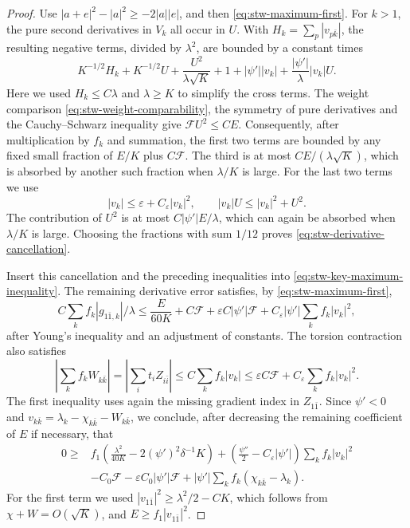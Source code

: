 \begin{proof}
Use $|a+e|^2-|a|^2\geq-2|a||e|$, and then \eqref{eq:stw-maximum-first}. For $k>1$, the pure second derivatives in $V_k$ all occur in $U$. With $H_k=\sum_p|v_{p\bar k}|$, the resulting negative terms, divided by $\lambda^2$, are bounded by a constant times
\[
 K^{-1/2}H_k+K^{-1/2}U
       +\frac{U^2}{\lambda\sqrt K}+1
       +|\psi'||v_k|+\frac{|\psi'|}{\lambda}|v_k|U.
\]
Here we used $H_k\leq C\lambda$ and $\lambda\geq K$ to simplify the cross terms. The weight comparison \eqref{eq:stw-weight-comparability}, the symmetry of pure derivatives and the Cauchy--Schwarz inequality give $\mathcal F U^2\leq C E$. Consequently, after multiplication by $f_k$ and summation, the first two terms are bounded by any fixed small fraction of $E/K$ plus $C\mathcal F$. The third is at most $CE/(\lambda\sqrt K)$, which is absorbed by another such fraction when $\lambda/K$ is large. For the last two terms we use
\[
 |v_k|\leq\varepsilon+C_\varepsilon|v_k|^2,\qquad
 |v_k|U\leq |v_k|^2+U^2.
\]
The contribution of $U^2$ is at most $C|\psi'|E/\lambda$, which can again be absorbed when $\lambda/K$ is large. Choosing the fractions with sum $1/12$ proves \eqref{eq:stw-derivative-cancellation}.

Insert this cancellation and the preceding inequalities into \eqref{eq:stw-key-maximum-inequality}. The remaining derivative error satisfies, by \eqref{eq:stw-maximum-first},
\[
 C\sum_k f_k|g_{1\bar1,k}|/\lambda
 \leq\frac{E}{60K}+C\mathcal F
      +\varepsilon C|\psi'|\mathcal F
      +C_\varepsilon|\psi'|\sum_k f_k|v_k|^2,
\]
after Young's inequality and an adjustment of constants. The torsion contraction also satisfies
\[
 \left|\sum_k f_kW_{k\bar k}\right|
    =\left|\sum_i t_iZ_{i\bar i}\right|
    \leq C\sum_k f_k|v_k|
    \leq\varepsilon C\mathcal F+C_\varepsilon\sum_k f_k|v_k|^2.
\]
The first inequality uses again the missing gradient index in $Z_{1\bar1}$. Since $\psi'<0$ and $v_{k\bar k}=\lambda_k-\chi_{k\bar k}-W_{k\bar k}$, we conclude, after decreasing the remaining coefficient of $E$ if necessary, that
\begin{equation}\label{eq:stw-first-case-closure}
 \begin{split}
 0\geq{}& f_1\left(\frac{\lambda^2}{40K}
                      -2(\psi')^2\delta^{-1}K\right)
    +\left(\frac{\psi''}{2}-C_\varepsilon|\psi'|\right)
                           \sum_k f_k|v_k|^2\\
 &-C_0\mathcal F-\varepsilon C_0|\psi'|\mathcal F
       +|\psi'|\sum_k f_k(\chi_{k\bar k}-\lambda_k).
 \end{split}
\end{equation}
For the first term we used
$|v_{1\bar1}|^2\geq\lambda^2/2-CK$, which follows from $\chi+W=O(\sqrt K)$, and $E\geq f_1|v_{1\bar1}|^2$.


\end{proof}
